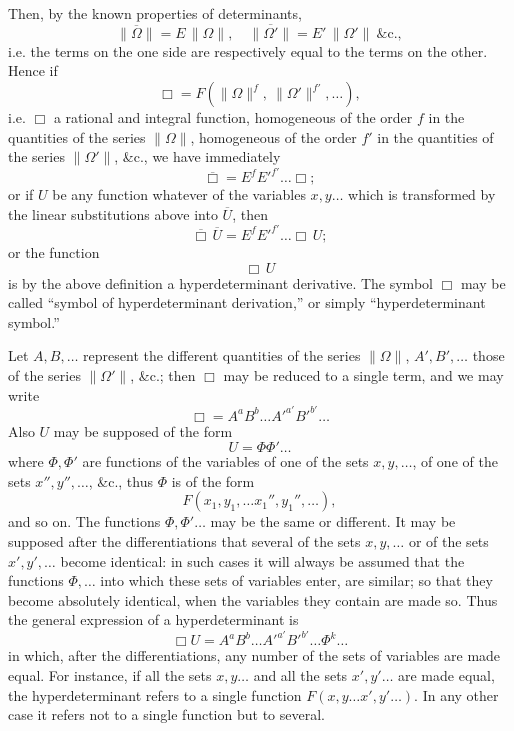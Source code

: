 \documentclass[11pt]{article}
\begin{document}
Then, by the known properties of determinants,
\[
\|\overline{\Omega}\| = E\,\|\Omega\|,\quad \|\overline{\Omega'}\| = E'\,\|\Omega'\|\ \&\text{c.},
\]
i.e. the terms on the one side are respectively equal to the terms on the other. Hence if
\[
\Box = F(\|\Omega\|^f,\ \|\Omega'\|^{f'},\ldots),
\]
i.e. $\Box$ a rational and integral function, homogeneous of the order $f$ in the quantities
of the series $\|\Omega\|$, homogeneous of the order $f'$ in the quantities of the series $\|\Omega'\|$,
\&c., we have immediately
\[
\overline{\Box} = E^f E'^{f'} \ldots \Box;
\]
or if $U$ be any function whatever of the variables $x, y \ldots$ which is transformed by
the linear substitutions above into $\overline{U}$, then
\[
\overline{\Box}\,\overline{U} = E^f E'^{f'} \ldots \Box\,U;
\]
or the function
\[
\Box\,U
\]
is by the above definition a hyperdeterminant derivative. The symbol $\Box$ may be called
``symbol of hyperdeterminant derivation,'' or simply ``hyperdeterminant symbol.''

Let $A, B,\ldots$ represent the different quantities of the series $\|\Omega\|$, $A', B',\ldots$ those of
the series $\|\Omega'\|$, \&c.; then $\Box$ may be reduced to a single term, and we may write
\[
\Box = A^a B^b \ldots A'^{a'} B'^{b'} \ldots
\]
Also $U$ may be supposed of the form
\[
U = \Phi \Phi' \ldots
\]
where $\Phi, \Phi'$ are functions of the variables of one of the sets $x, y,\ldots$, of one of the
sets $x'', y'',\ldots$, \&c., thus $\Phi$ is of the form
\[
F(x_1, y_1, \ldots x_1'', y_1'',\ldots),
\]
and so on. The functions $\Phi, \Phi'\ldots$ may be the same or different. It may be supposed
after the differentiations that several of the sets $x, y,\ldots$ or of the sets $x', y',\ldots$
become identical: in such cases it will always be assumed that the functions $\Phi,\ldots$
into which these sets of variables enter, are similar; so that they become absolutely
identical, when the variables they contain are made so. Thus the general expression
of a hyperdeterminant is
\[
\Box U = A^a B^b \ldots A'^{a'} B'^{b'} \ldots \Phi^k \ldots
\]
in which, after the differentiations, any number of the sets of variables are made equal.
For instance, if all the sets $x, y \ldots$ and all the sets $x', y' \ldots$ are made equal, the
hyperdeterminant refers to a single function $F(x, y \ldots x', y' \ldots)$. In any other case it
refers not to a single function but to several.
\end{document}
